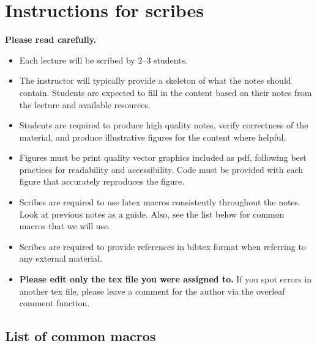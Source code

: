 \documentclass[12pt]{article}
\begin{document}

\maketitle

\section*{Instructions for scribes}

{\bf\color{red} Please read carefully.}

\begin{itemize}
\item Each lecture will be scribed by 2--3 students. 
\item The instructor will typically provide a skeleton of what the notes should contain. Students are expected to fill in the content based on their notes from the lecture and available resources.
\item Students are required to produce high quality notes, verify correctness of the material, and produce illustrative figures for the content where helpful. 
\item Figures must be print quality vector graphics included as pdf, following best practices for readability and accessibility. Code must be provided with each figure that accurately reproduces the figure.
\item Scribes are required to use latex macros consistently throughout the notes. Look at previous notes as a guide. Also, see the list below for common macros that we will use.
\item Scribes are required to provide references in bibtex format when referring to any external material.
\item {\bf Please edit only the tex file you were assigned to.} If you spot errors in another tex file, please leave a comment for the author via the overleaf comment function. 
\end{itemize}

\subsection*{List of common macros}
\end{document}
